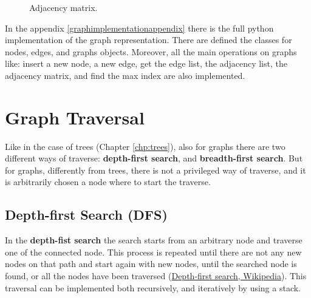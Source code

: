 \begin{figure}[H]
\centering
{}  
\caption[Adjacency matrix.]{Adjacency matrix.}
\label{graphs_5}
\end{figure}

In the appendix \ref{graphimplementationappendix} there is the full python implementation of the graph representation. There are defined the classes for nodes, edges, and graphs objects. Moreover, all the main operations on graphs like: insert a new node, a new edge, get the edge list, the adjacency list, the adjacency matrix, and find the max index are also implemented.

\section{Graph Traversal}
Like in the case of trees (Chapter \ref{chp:trees}), also for graphs there are two different ways of traverse: \textbf{depth-first search}, and \textbf{breadth-first search}. But for graphs, differently from trees, there is not a privileged way of traverse, and it is arbitrarily chosen a node where to start the traverse.

\subsection{Depth-first Search (DFS)}
In the \textbf{depth-fist search} the search starts from an arbitrary node and traverse one of the connected node. This process is repeated until there are not any new nodes on that path and start again with new nodes, until the searched node is found, or all the nodes have been traversed \cite{wikidepthfirst} (\href{https://en.wikipedia.org/wiki/Depth-first_search}{Depth-first search, Wikipedia}). This traversal can be implemented both recursively, and iteratively by using a stack.

